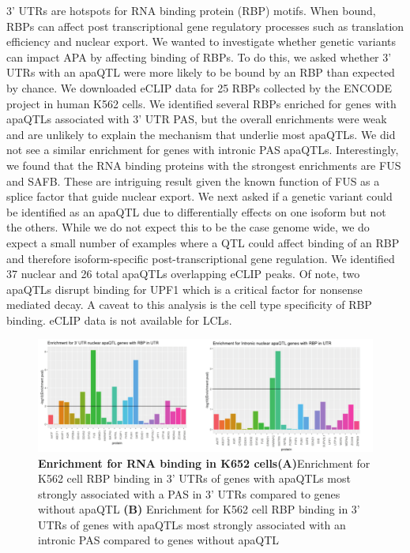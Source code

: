 3' UTRs are hotspots for RNA binding protein (RBP) motifs. When bound, RBPs can affect post transcriptional gene regulatory processes such as translation efficiency and nuclear export. We wanted to investigate whether genetic variants can impact APA by affecting binding of RBPs. To do this, we asked whether 3' UTRs with an apaQTL were more likely to be bound by an RBP than expected by chance. We downloaded eCLIP data for 25 RBPs collected by the ENCODE project in human K562 cells. We identified several RBPs enriched for genes with apaQTLs associated with 3' UTR PAS, but the overall enrichments were weak and are unlikely to explain the mechanism that underlie most apaQTLs. We did not see a similar enrichment for genes with intronic PAS apaQTLs. Interestingly, we found that the RNA binding proteins with the strongest enrichments are FUS and SAFB. These are intriguing result given the known function of FUS as a splice factor that guide nuclear export. We next asked if a genetic variant could be identified as an apaQTL due to differentially effects on one isoform but not the others. While we do not expect this to be the case genome wide, we do expect a small number of examples where a QTL could affect binding of an RBP and therefore isoform-specific post-transcriptional gene regulation.  We identified 37 nuclear and 26 total apaQTLs overlapping eCLIP peaks. Of note, two apaQTLs disrupt binding for UPF1 which is a critical factor for nonsense mediated decay. A caveat to this analysis is the cell type specificity of RBP binding. eCLIP data is not available for LCLs. 


\begin{figure}
\centering \includegraphics[width=5in]{img/ch02/figureAppendix3.pdf}
\caption[Enrichment for RNA binding in K652 cells]{\textbf{Enrichment for RNA binding in K652 cells}{\bf (A)}Enrichment for K562 cell RBP binding in 3' UTRs of genes with apaQTLs most strongly associated with a PAS in 3' UTRs compared to genes without apaQTL {\bf (B)} Enrichment for K562 cell RBP binding in 3' UTRs of genes with apaQTLs most strongly associated with an intronic PAS compared to genes without apaQTL }
\label{fig:Supplementaryfile1-Fig3}
\end{figure}


